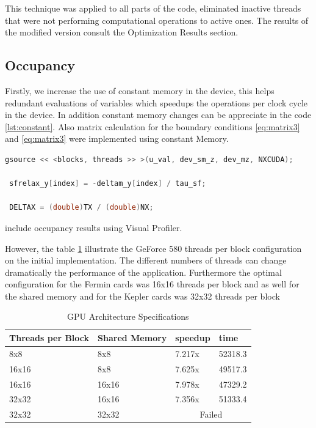 This technique was applied to all parts of the code, eliminated inactive threads that were not performing computational operations to active ones. The results of the modified version consult the Optimization Results section. 

\subsection{Occupancy}
 
Firstly, we increase the use of constant memory in the device, this helps redundant evaluations of variables which speedups the operations per clock cycle in the device. In addition  constant memory changes can be appreciate in the code \ref{lst:constant}. Also  matrix calculation for the boundary conditions \ref{eq:matrix3} and \ref{eq:matrix3} were implemented using constant Memory.
 
 \begin{lstlisting}[language=C++,  label={lst:constant}, caption={Constant Memory changes}]
 gsource << <blocks, threads >> >(u_val, dev_sm_z, dev_mz, NXCUDA);
 
 sfrelax_y[index] = -deltam_y[index] / tau_sf;
     
 DELTAX = (double)TX / (double)NX;
\end{lstlisting}


include occupancy results using Visual Profiler.
 
However, the table \ref{tab:threads} illustrate the GeForce 580 threads per block configuration on the initial implementation. The different numbers of threads can change dramatically the performance of the application. Furthermore the optimal configuration for the Fermin cards was 16x16 threads per block and as well for the shared memory and for the Kepler cards was 32x32 threads per block 

\begin{table}[h]
\centering
  \begin{tabular} { | l | l | l | l | }
    \hline
    Threads per Block & Shared Memory & speedup & time \\
    \hline
     8x8 &  8x8 & 7.217x & 52318.3  \\
    \hline
     16x16 & 8x8 & 7.625x & 49517.3 \\
    \hline
    16x16 & 16x16 & 7.978x & 47329.2 \\
    \hline
    32x32 & 16x16 & 7.356x & 51333.4 \\
    \hline
    32x32 & 32x32 & \multicolumn{2}{|c|}{Failed}\\
    \hline
  \end{tabular}
  \caption{GPU Architecture Specifications}
  \label{tab:threads}
  \end{table}


